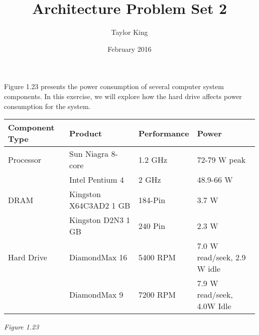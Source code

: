 \documentclass{article}
\title{Architecture Problem Set 2}
\author{Taylor King }
\date{February 2016}
\begin{document}
\maketitle
\section{}
Figure 1.23 presents the power consumption of several computer system components. In this exercise, we will explore how the hard drive affects power consumption for the system.

\vspace{1cm}
\begin{minipage}{\textwidth}
\begin{tabular}{|l|l|l|l|}
\hline
\textbf{Component Type} & \textbf{Product} & \textbf{Performance} & \textbf{Power}\\
\hline
Processor & Sun Niagra 8-core & 1.2 GHz & 72-79 W peak \\
& Intel Pentium 4 & 2 GHz & 48.9-66 W \\
DRAM & Kingston X64C3AD2 1 GB & 184-Pin & 3.7 W \\
& Kingston D2N3 1 GB & 240 Pin & 2.3 W\\
Hard Drive & DiamondMax 16 & 5400 RPM & 7.0 W read/seek, 2.9 W idle \\
& DiamondMax 9 & 7200 RPM & 7.9 W read/seek, 4.0W Idle\\
\hline
\end{tabular}\bigskip
\par{\textit{Figure 1.23}}
\end{minipage}
\end{document}
